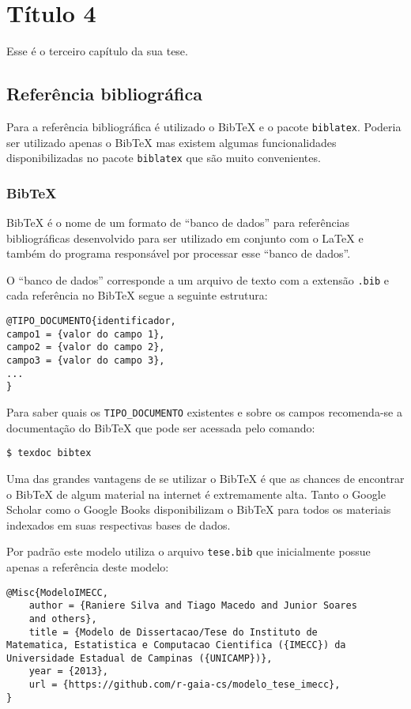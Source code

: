 \chapter{Título 4}
Esse é o terceiro capítulo da sua tese.

\section{Referência bibliográfica}
Para a referência bibliográfica é utilizado o BibTeX e o pacote
\lstinline+biblatex+. Poderia ser utilizado apenas o BibTeX mas existem algumas
funcionalidades disponibilizadas no pacote \lstinline+biblatex+ que são muito
convenientes.

\subsection{BibTeX}
BibTeX é o nome de um formato de ``banco de dados'' para referências
bibliográficas desenvolvido para ser utilizado em conjunto com o LaTeX e também
do programa responsável por processar esse ``banco de dados''.

O ``banco de dados'' corresponde a um arquivo de texto com a extensão
\lstinline+.bib+ e cada referência no BibTeX segue a seguinte estrutura:
\begin{lstlisting}
@TIPO_DOCUMENTO{identificador,
campo1 = {valor do campo 1},
campo2 = {valor do campo 2},
campo3 = {valor do campo 3},
...
}
\end{lstlisting}

Para saber quais os \lstinline+TIPO_DOCUMENTO+ existentes e sobre os
campos recomenda-se a documentação do BibTeX que pode ser acessada pelo comando:
\begin{lstlisting}
$ texdoc bibtex
\end{lstlisting}

Uma das grandes vantagens de se utilizar o BibTeX é que as chances de encontrar
o BibTeX de algum material na internet é extremamente alta. Tanto o Google
Scholar como o Google Books disponibilizam o BibTeX para todos os materiais
indexados em suas respectivas bases de dados.

Por padrão este modelo\nocite{ModeloIMECC} utiliza o arquivo
\lstinline+tese.bib+ que inicialmente possue apenas a referência deste modelo:
\begin{lstlisting}
@Misc{ModeloIMECC,
    author = {Raniere Silva and Tiago Macedo and Junior Soares
    and others},
    title = {Modelo de Dissertacao/Tese do Instituto de
Matematica, Estatistica e Computacao Cientifica ({IMECC}) da
Universidade Estadual de Campinas ({UNICAMP})},
    year = {2013},
    url = {https://github.com/r-gaia-cs/modelo_tese_imecc},
}
\end{lstlisting}

